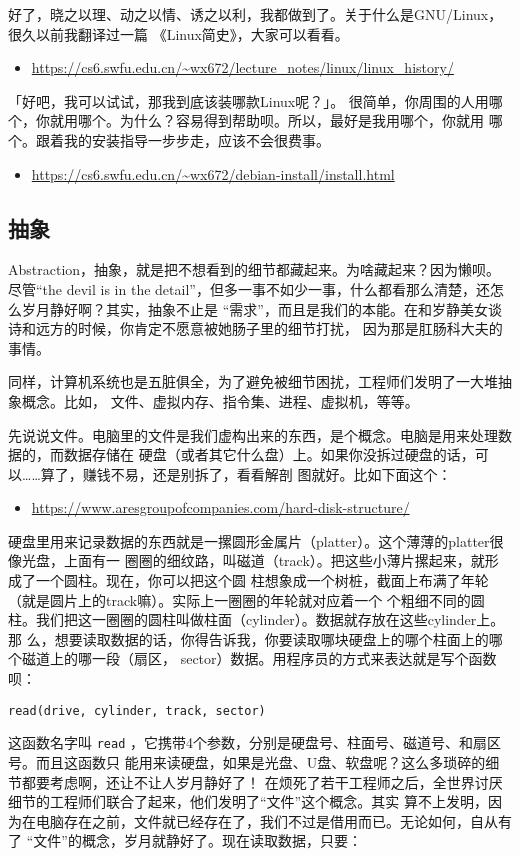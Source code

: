 \documentclass{wx672ctexart}
\newcommand\mpic[1]{%
  \marginpar{\texttt{[image: thumbnails/\#1]}}}
\begin{document}
好了，晓之以理、动之以情、诱之以利，我都做到了。关于什么是GNU/Linux，很久以前我翻译过一篇
《Linux简史》，大家可以看看。
\begin{itemize}
\item \url{https://cs6.swfu.edu.cn/\~wx672/lecture\_notes/linux/linux\_history/}
\end{itemize}

「好吧，我可以试试，那我到底该装哪款Linux呢？」。
很简单，你周围的人用哪个，你就用哪个。为什么？容易得到帮助呗。所以，最好是我用哪个，你就用
哪个。跟着我的安装指导一步步走，应该不会很费事。
\begin{itemize}
\item \url{https://cs6.swfu.edu.cn/\~wx672/debian-install/install.html}
\end{itemize}

\subsection{抽象}
\label{sec:orgc6f1cc9}\mpic{pg_0010}
Abstraction，抽象，就是把不想看到的细节都藏起来。为啥藏起来？因为懒呗。尽管“the devil is
in the detail”，但多一事不如少一事，什么都看那么清楚，还怎么岁月静好啊？其实，抽象不止是
“需求”，而且是我们的本能。在和岁静美女谈诗和远方的时候，你肯定不愿意被她肠子里的细节打扰，
因为那是肛肠科大夫的事情。

同样，计算机系统也是五脏俱全，为了避免被细节困扰，工程师们发明了一大堆抽象概念。比如，
文件、虚拟内存、指令集、进程、虚拟机，等等。

先说说文件。电脑里的文件是我们虚构出来的东西，是个概念。电脑是用来处理数据的，而数据存储在
硬盘（或者其它什么盘）上。如果你没拆过硬盘的话，可以……算了，赚钱不易，还是别拆了，看看解剖
图就好。比如下面这个：
\begin{itemize}
\item \url{https://www.aresgroupofcompanies.com/hard-disk-structure/}
\end{itemize}

硬盘里用来记录数据的东西就是一摞圆形金属片（platter）。这个薄薄的platter很像光盘，上面有一
圈圈的细纹路，叫磁道（track）。把这些小薄片摞起来，就形成了一个圆柱。现在，你可以把这个圆
柱想象成一个树桩，截面上布满了年轮（就是圆片上的track嘛）。实际上一圈圈的年轮就对应着一个
个粗细不同的圆柱。我们把这一圈圈的圆柱叫做柱面（cylinder）。数据就存放在这些cylinder上。那
么，想要读取数据的话，你得告诉我，你要读取哪块硬盘上的哪个柱面上的哪个磁道上的哪一段（扇区，
sector）数据。用程序员的方式来表达就是写个函数呗：
\begin{verbatim}
read(drive, cylinder, track, sector)
\end{verbatim}
这函数名字叫 \texttt{read} ，它携带4个参数，分别是硬盘号、柱面号、磁道号、和扇区号。而且这函数只
能用来读硬盘，如果是光盘、U盘、软盘呢？这么多琐碎的细节都要考虑啊，还让不让人岁月静好了！
在烦死了若干工程师之后，全世界讨厌细节的工程师们联合了起来，他们发明了“文件”这个概念。其实
算不上发明，因为在电脑存在之前，文件就已经存在了，我们不过是借用而已。无论如何，自从有了
“文件”的概念，岁月就静好了。现在读取数据，只要：
\end{document}
